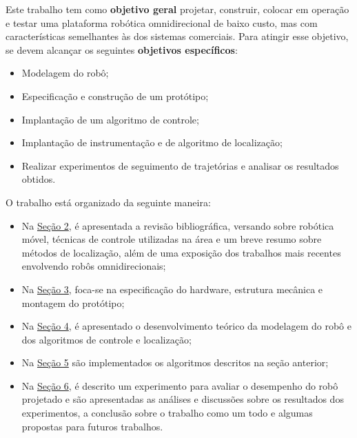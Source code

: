 
Este trabalho tem como \textbf{objetivo geral} projetar, construir, colocar em operação e testar uma plataforma robótica omnidirecional de baixo custo, mas com características semelhantes às dos sistemas comerciais. Para atingir esse objetivo, se devem alcançar os seguintes \textbf{objetivos específicos}:

\begin{itemize}
  \item{Modelagem do robô;} %
  \item{Especificação e construção de um protótipo;}
  \item{Implantação de um algoritmo de controle;} %
  \item{Implantação de instrumentação e de algoritmo de localização;}
  \item{Realizar experimentos de seguimento de trajetórias e analisar os resultados obtidos.}
\end{itemize}


O trabalho está organizado da seguinte maneira:
\begin{itemize}
  \item{Na \hyperref[sec:revbib]{Seção 2}, é apresentada a revisão bibliográfica, versando sobre robótica móvel, técnicas de controle utilizadas na área e um breve resumo sobre métodos de localização, além de uma exposição dos trabalhos mais recentes envolvendo robôs omnidirecionais;} %
  \item{Na \hyperref[sec:montagem]{Seção 3}, foca-se na especificação do hardware, estrutura mecânica e montagem do protótipo;}
  \item{Na \hyperref[sec:teorico]{Seção 4}, é apresentado o desenvolvimento teórico da modelagem do robô e dos algoritmos de controle e localização;}
  \item{Na \hyperref[sec:software]{Seção 5} são implementados os algoritmos descritos na seção anterior;}
  \item{Na \hyperref[sec:experimental]{Seção 6}, é descrito um experimento para avaliar o desempenho do robô projetado e são apresentadas as análises e discussões sobre os resultados dos experimentos, a conclusão sobre o trabalho como um todo e algumas propostas para futuros trabalhos.}
\end{itemize}

